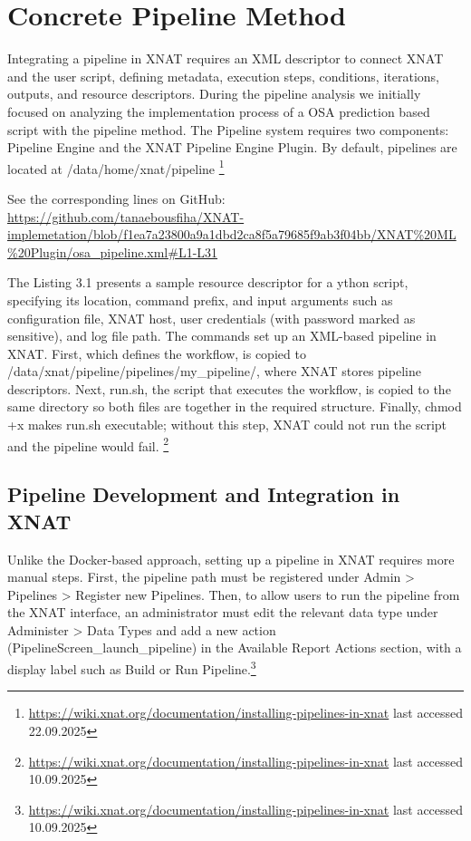 
\section{Concrete Pipeline Method}

Integrating a pipeline in XNAT requires an \ac{XML} descriptor to connect XNAT and the user script, defining metadata, execution steps, conditions, iterations, outputs, and resource descriptors.
During the pipeline analysis we initially focused on analyzing the implementation process of a OSA prediction based script with the pipeline method. The Pipeline system requires two components: Pipeline Engine and the XNAT Pipeline Engine Plugin. By default, pipelines are located at /data/home/xnat/pipeline \footnote{\url{https://wiki.xnat.org/documentation/installing-pipelines-in-xnat} last accessed 22.09.2025}

\normalsize



\noindent\footnotesize See the corresponding lines on GitHub:\url{ https://github.com/tanaebousfiha/XNAT-implemetation/blob/f1ea7a23800a9a1dbd2ca8f5a79685f9ab3f04bb/XNAT%20ML%20Plugin/osa_pipeline.xml#L1-L31}
\normalsize

The  Listing 3.1 presents a sample resource descriptor for a ython script, specifying its location, command prefix, and input arguments such as configuration file, XNAT host, user credentials (with password marked as sensitive), and log file path. 
The commands set up an XML-based pipeline in XNAT. First, which defines the workflow, is copied to /data/xnat/pipeline/pipelines/my\_pipeline/, where XNAT stores pipeline descriptors. Next, run.sh, the script that executes the workflow, is copied to the same directory so both files are together in the required structure. Finally, chmod +x makes run.sh executable; without this step, XNAT could not run the script and the pipeline would fail.
\footnote{\url{https://wiki.xnat.org/documentation/installing-pipelines-in-xnat} last accessed 10.09.2025}
\normalsize
\subsection{Pipeline Development and Integration in XNAT}
Unlike the Docker-based approach, setting up a pipeline in XNAT requires more manual steps. First, the pipeline path must be registered under Admin > Pipelines > Register new Pipelines. Then, to allow users to run the pipeline from the XNAT interface, an administrator must edit the relevant data type under Administer > Data Types and add a new action (PipelineScreen\_launch\_pipeline) in the Available Report Actions section, with a display label such as Build or Run Pipeline.\footnote{\url{https://wiki.xnat.org/documentation/installing-pipelines-in-xnat} last accessed 10.09.2025}
\normalsize
